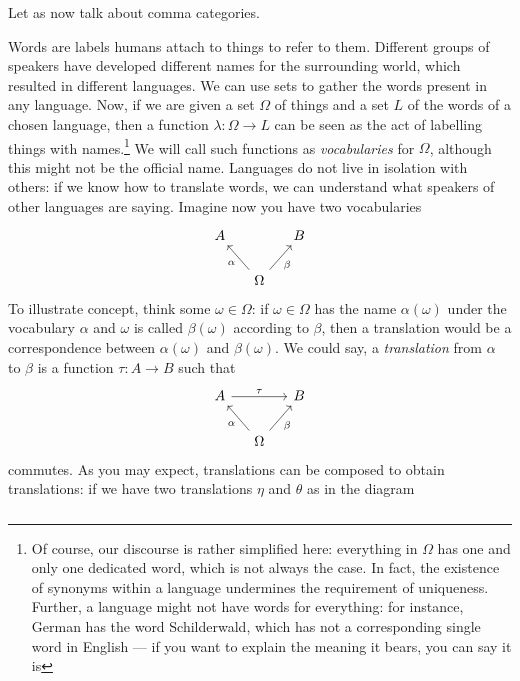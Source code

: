 Let as now talk about comma categories.

\begin{example}
Words are labels humans attach to things to refer to them. Different groups of speakers have developed different names for the surrounding world, which resulted in different languages. We can use sets to gather the words present in any language. Now, if we are given a set \(\Omega\) of things and a set \(L\) of the words of a chosen language, then a function \(\lambda : \Omega \to L\) can be seen as the act of labelling things with names.\footnote{Of course, our discourse is rather simplified here: everything in \(\Omega\) has one and only one dedicated word, which is not always the case. In fact, the existence of synonyms within a language undermines the requirement of uniqueness. Further, a language might not have words for everything: for instance, German has the word \textgerman{Schilderwald}, which has not a corresponding single word in English --- if you want to explain the meaning it bears, you can say it is } We will call such functions as {\em vocabularies} for \(\Omega\), although this might not be the official name.\newline
Languages do not live in isolation with others: if we know how to translate words, we can understand what speakers of other languages are saying. Imagine now you have two vocabularies
\[\begin{tikzcd}[column sep=small]
A & & B \\
& \Omega \ar["\alpha", ul] \ar["\beta", ur, swap]
\end{tikzcd}\]
To illustrate concept, think some \(\omega \in \Omega\): if \(\omega \in \Omega\) has the name \(\alpha(\omega)\) under the vocabulary \(\alpha\) and \(\omega\) is called \(\beta(\omega)\) according to \(\beta\), then a translation would be a correspondence between \(\alpha(\omega)\) and \(\beta(\omega)\). We could say, a {\em translation} from \(\alpha\) to \(\beta\) is a function \(\tau : A \to B\) such that
\[\begin{tikzcd}[column sep=small]
A \ar["\tau", rr] & & B \\
& \Omega \ar["\alpha", ul] \ar["\beta", ur, swap]
\end{tikzcd}\]
commutes. As you may expect, translations can be composed to obtain translations: if we have two translations \(\eta\) and \(\theta\) as in the diagram
\[\begin{tikzcd}

\end{tikzcd}\]
\end{example}
